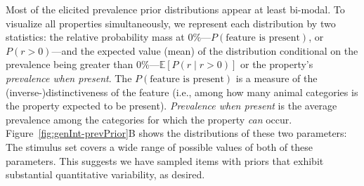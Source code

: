 \documentclass[floatsintext,man]{apa6}
\begin{document}
Most of the elicited prevalence prior distributions appear at least bi-modal.
To visualize all properties simultaneously, we represent each distribution by two statistics: the relative probability mass at 0\%---\(P(\text{feature is present})\), or \(P(r > 0)\)---and the expected value (mean) of the distribution conditional on the prevalence being greater than 0\%---\(\mathbb{E}[P(r \mid r>0)]\) or the property's \emph{prevalence when present}.
The $P(\text{feature is present})$ is a measure of the (inverse-)distinctiveness of the feature (i.e., among how many animal categories is the property expected to be present). 
\emph{Prevalence when present} is the average prevalence among the categories for which the property \emph{can} occur. 
Figure~\ref{fig:genInt-prevPrior}B shows the distributions of these two parameters: The stimulus set covers a wide range of possible values of both of these parameters.
This suggests we have sampled items with priors that exhibit  substantial quantitative variability, as desired.
\end{document}
